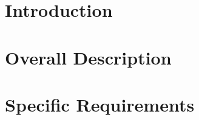 \documentclass{Configuration_Files/PoliMi3i_thesis}
\begin{document}
\thispagestyle{empty}
\tableofcontents %
\thispagestyle{empty}
\cleardoublepage

%
%
%    
%

\mainmatter %

\chapter{Introduction}
\label{ch:introduction}%



\chapter{Overall Description}
\label{ch:Overall_description}%

\chapter{Specific Requirements}
\label{c:Specific_requirements}%

\end{document}
